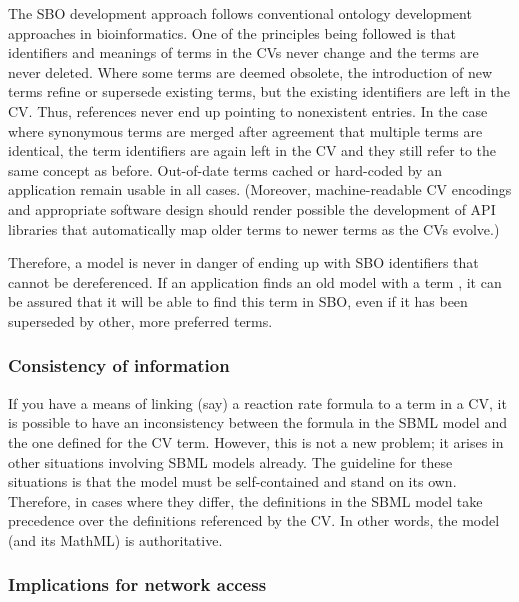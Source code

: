 The SBO development approach follows conventional ontology
development approaches in bioinformatics.  One of the principles
being followed is that identifiers and meanings of terms in the
CVs never change and the terms are never deleted.  Where some
terms are deemed obsolete, the introduction of new terms refine or
supersede existing terms, but the existing identifiers are left in
the CV.  Thus, references never end up pointing to nonexistent
entries.  In the case where synonymous terms are merged after
agreement that multiple terms are identical, the term identifiers
are again left in the CV and they still refer to the same concept
as before.  Out-of-date terms cached or hard-coded by an
application remain usable in all cases.  (Moreover, machine-readable
CV encodings and appropriate software design should render
possible the development of API libraries that automatically map
older terms to newer terms as the CVs evolve.)

Therefore, a model is never in danger of ending up with SBO
identifiers that cannot be dereferenced.  If an application finds
an old model with a term , it can be assured
that it will be able to find this term in SBO, even if it has been
superseded by other, more preferred terms.


\subsubsection{Consistency of information}

If you have a means of linking (say) a reaction rate formula to a
term in a CV, it is possible to have an inconsistency between the
formula in the SBML model and the one defined for the CV term.
However, this is not a new problem; it arises in other situations
involving SBML models already.  The guideline for these situations
is that the model must be self-contained and stand on its own.
Therefore, in cases where they differ, the definitions in the SBML
model take precedence over the definitions referenced by the CV.
In other words, the model (and its MathML) is authoritative.


\subsubsection{Implications for network access}
\label{sec:sbo-implications-for-network-access}

